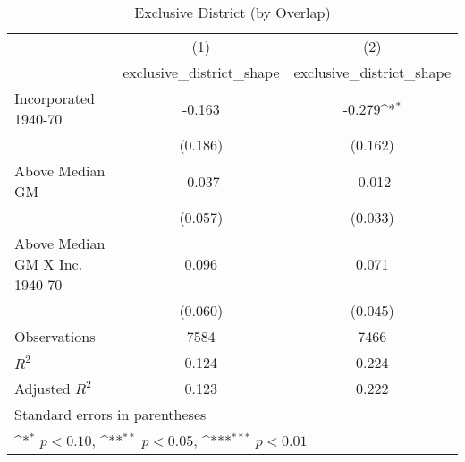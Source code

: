 \begin{table}[htbp]\centering
\def\sym#1{\ifmmode^{#1}\else\(^{#1}\)\fi}
\caption{Exclusive District (by Overlap)}
\begin{tabular}{l*{2}{c}}
\hline\hline
                    &\multicolumn{1}{c}{(1)}&\multicolumn{1}{c}{(2)}\\
                    &\multicolumn{1}{c}{exclusive\_district\_shape}&\multicolumn{1}{c}{exclusive\_district\_shape}\\
\hline
Incorporated 1940-70&      -0.163         &      -0.279\sym{*}  \\
                    &     (0.186)         &     (0.162)         \\
[1em]
Above Median GM     &      -0.037         &      -0.012         \\
                    &     (0.057)         &     (0.033)         \\
[1em]
Above Median GM X Inc. 1940-70&       0.096         &       0.071         \\
                    &     (0.060)         &     (0.045)         \\
\hline
Observations        &        7584         &        7466         \\
\(R^{2}\)           &       0.124         &       0.224         \\
Adjusted \(R^{2}\)  &       0.123         &       0.222         \\
\hline\hline
\multicolumn{3}{l}{\footnotesize Standard errors in parentheses}\\
\multicolumn{3}{l}{\footnotesize \sym{*} \(p<0.10\), \sym{**} \(p<0.05\), \sym{***} \(p<0.01\)}\\
\end{tabular}
\end{table}
